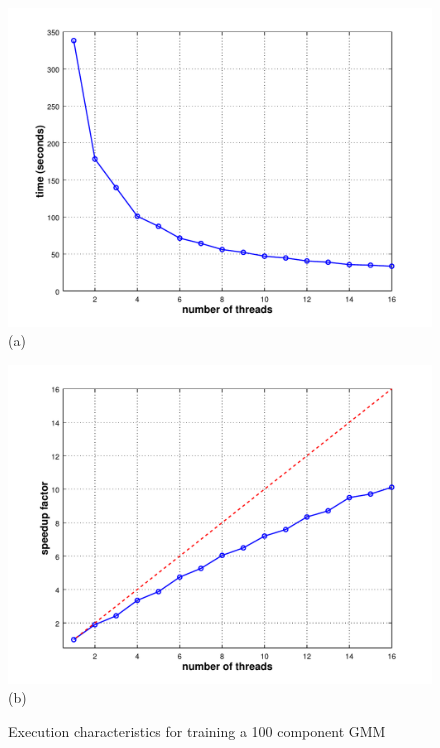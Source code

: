 \begin{figure}[!t]
\centering
\begin{minipage}{\textwidth}
  \centering
  \begin{minipage}{0.5\textwidth}
    \centering
    \includegraphics[width=1.1\textwidth]{plot1.pdf}\\
    {(a)}
  \end{minipage}%
  \begin{minipage}{0.5\textwidth}
    \centering
    \includegraphics[width=1.1\textwidth]{plot2.pdf}\\
    {(b)}
  \end{minipage}
\end{minipage}
\caption
  {
  Execution characteristics for training a 100 component GMM
}
\end{figure}
